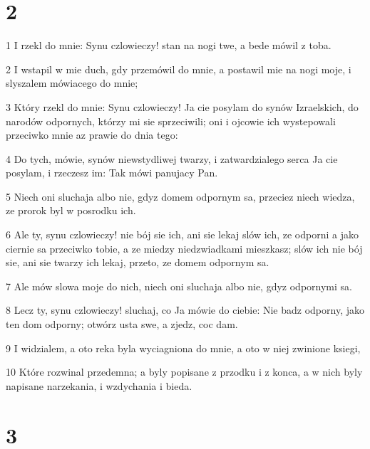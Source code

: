 \chapter{2}

\par 1 I rzekl do mnie: Synu czlowieczy! stan na nogi twe, a bede mówil z toba.
\par 2 I wstapil w mie duch, gdy przemówil do mnie, a postawil mie na nogi moje, i slyszalem mówiacego do mnie;
\par 3 Który rzekl do mnie: Synu czlowieczy! Ja cie posylam do synów Izraelskich, do narodów odpornych, którzy mi sie sprzeciwili; oni i ojcowie ich wystepowali przeciwko mnie az prawie do dnia tego:
\par 4 Do tych, mówie, synów niewstydliwej twarzy, i zatwardzialego serca Ja cie posylam, i rzeczesz im: Tak mówi panujacy Pan.
\par 5 Niech oni sluchaja albo nie, gdyz domem odpornym sa, przeciez niech wiedza, ze prorok byl w posrodku ich.
\par 6 Ale ty, synu czlowieczy! nie bój sie ich, ani sie lekaj slów ich, ze odporni a jako ciernie sa przeciwko tobie, a ze miedzy niedzwiadkami mieszkasz; slów ich nie bój sie, ani sie twarzy ich lekaj, przeto, ze domem odpornym sa.
\par 7 Ale mów slowa moje do nich, niech oni sluchaja albo nie, gdyz odpornymi sa.
\par 8 Lecz ty, synu czlowieczy! sluchaj, co Ja mówie do ciebie: Nie badz odporny, jako ten dom odporny; otwórz usta swe, a zjedz, coc dam.
\par 9 I widzialem, a oto reka byla wyciagniona do mnie, a oto w niej zwinione ksiegi,
\par 10 Które rozwinal przedemna; a byly popisane z przodku i z konca, a w nich byly napisane narzekania, i wzdychania i bieda.

\chapter{3}

